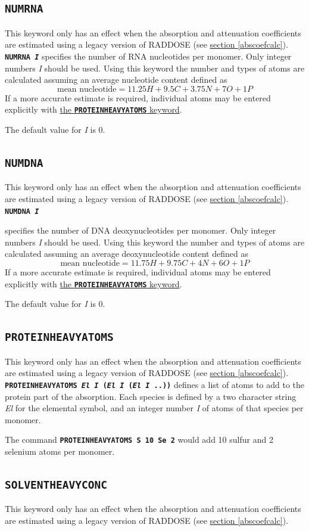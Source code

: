 \documentclass[a4paper]{article}
\newcommand{\Keyword}[1]{\texttt{\textbf{#1}}\xspace}
\newcommand{\SB}{\\[0.2em]}
\newcommand{\RDLegacyKeyword}{This keyword only has an effect when the absorption and attenuation coefficients are estimated using a legacy version of RADDOSE (see \hyperref[abscoefcalc]{section \ref*{abscoefcalc}}).\SB
}
\begin{document}
\subsection{\Keyword{NUMRNA}}
\label{numrna}
\RDLegacyKeyword

\noindent \Keyword{NUMRNA \textit{I}}
specifies the number of RNA nucleotides per monomer. Only integer numbers \textit{I} should be used. Using this keyword the number and types of atoms are calculated assuming an average nucleotide content defined as
\[ \mbox{mean nucleotide} = 11.25H + 9.5C + 3.75N + 7O + 1P \]
If a more accurate estimate is required, individual atoms may be entered explicitly with \hyperref[proteinheavyatoms]{the \Keyword{PROTEINHEAVYATOMS} keyword}.

The default value for \textit{I} is 0.


\subsection{\Keyword{NUMDNA}}
\label{numdna}
\RDLegacyKeyword

\noindent \Keyword{NUMDNA \textit{I}}

specifies the number of DNA deoxynucleotides per monomer. Only integer numbers \textit{I} should be used. Using this keyword the number and types of atoms are calculated assuming an average deoxynucleotide content defined as
\[ \mbox{mean nucleotide} = 11.75H + 9.75C + 4N + 6O + 1P \]
If a more accurate estimate is required, individual atoms may be entered explicitly with \hyperref[proteinheavyatoms]{the \Keyword{PROTEINHEAVYATOMS} keyword}.

The default value for \textit{I} is 0.


\subsection{\Keyword{PROTEINHEAVYATOMS}}
\label{proteinheavyatoms}
\RDLegacyKeyword

\noindent \Keyword{PROTEINHEAVYATOMS \textit{El I} (\textit{El I} (\textit{El I} ..))}
defines a list of atoms to add to the protein part of the absorption. Each species is defined by a two character string \textit{El} for the elemental symbol, and an integer number \textit{I} of atoms of that species per monomer.

The command \Keyword{PROTEINHEAVYATOMS S 10 Se 2} would add 10 sulfur and 2 selenium atoms per monomer.


\subsection{\Keyword{SOLVENTHEAVYCONC}}
\label{solventheavyconc}
\RDLegacyKeyword
\end{document}
